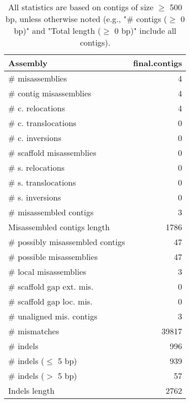 \documentclass[12pt,a4paper]{article}
\begin{document}
\begin{table}[ht]
\begin{center}
\caption{All statistics are based on contigs of size $\geq$ 500 bp, unless otherwise noted (e.g., "\# contigs ($\geq$ 0 bp)" and "Total length ($\geq$ 0 bp)" include all contigs).}
\begin{tabular}{|l*{1}{|r}|}
\hline
Assembly & final.contigs \\ \hline
\# misassemblies & 4 \\ \hline
\hspace{2mm}\# contig misassemblies & 4 \\ \hline
\hspace{5mm}\# c. relocations & 4 \\ \hline
\hspace{5mm}\# c. translocations & 0 \\ \hline
\hspace{5mm}\# c. inversions & 0 \\ \hline
\hspace{2mm}\# scaffold misassemblies & 0 \\ \hline
\hspace{5mm}\# s. relocations & 0 \\ \hline
\hspace{5mm}\# s. translocations & 0 \\ \hline
\hspace{5mm}\# s. inversions & 0 \\ \hline
\# misassembled contigs & 3 \\ \hline
Misassembled contigs length & 1786 \\ \hline
\# possibly misassembled contigs & 47 \\ \hline
\hspace{5mm}\# possible misassemblies & 47 \\ \hline
\# local misassemblies & 3 \\ \hline
\# scaffold gap ext. mis. & 0 \\ \hline
\# scaffold gap loc. mis. & 0 \\ \hline
\# unaligned mis. contigs & 3 \\ \hline
\# mismatches & 39817 \\ \hline
\# indels & 996 \\ \hline
\hspace{5mm}\# indels ($\leq$ 5 bp) & 939 \\ \hline
\hspace{5mm}\# indels ($>$ 5 bp) & 57 \\ \hline
Indels length & 2762 \\ \hline
\end{tabular}
\end{center}
\end{table}
\end{document}
